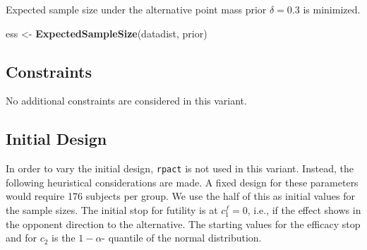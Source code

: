 \documentclass[
]{book}
\newenvironment{Shaded}{\begin{snugshade}}{\end{snugshade}}
\newcommand{\KeywordTok}[1]{\textcolor[rgb]{0.13,0.29,0.53}{\textbf{#1}}}
\newcommand{\NormalTok}[1]{#1}
\newcommand{\StringTok}[1]{\textcolor[rgb]{0.31,0.60,0.02}{#1}}
\begin{document}
Expected sample size under the alternative point mass prior \(\delta = 0.3\)
is minimized.

\begin{Shaded}
\begin{Highlighting}[]
\NormalTok{ess \textless{}{-}}\StringTok{ }\KeywordTok{ExpectedSampleSize}\NormalTok{(datadist, prior)}
\end{Highlighting}
\end{Shaded}

\hypertarget{constraints-10}{%
\subsection{Constraints}\label{constraints-10}}

No additional constraints are considered in this variant.

\hypertarget{initial-design-8}{%
\subsection{Initial Design}\label{initial-design-8}}

In order to vary the initial design, \texttt{rpact} is not used in this variant.
Instead, the following heuristical considerations are made.
A fixed design for these parameters would require
176
subjects per group. We use the half of this as initial values for the
sample sizes.
The initial stop for futility is at \(c_1^f=0\), i.e., if the effect shows
in the opponent direction to the alternative.
The starting values for the efficacy stop and for \(c_2\) is the \(1-\alpha\)-
quantile of the normal distribution.
\end{document}
